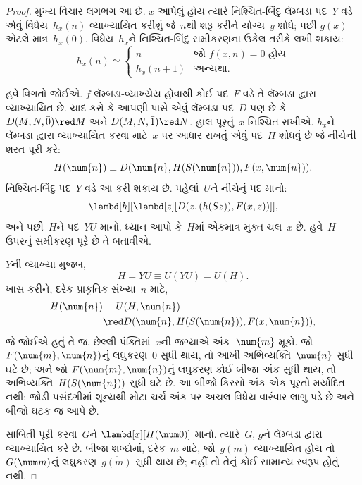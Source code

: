 \begin{proof}
મુખ્ય વિચાર લગભગ આ છે. $x$ આપેલું હોય ત્યારે નિશ્ચિત-બિંદુ
લૅમ્બડા પદ~$Y$ વડે એવું વિધેય~$h_x(n)$ વ્યાખ્યાયિત કરીશું જે~$n$થી
શરૂ કરીને યોગ્ય~$y$ શોધે; પછી $g(x)$ એટલે માત્ર~$h_x(0)$.
વિધેય~$h_x$ને નિશ્ચિત-બિંદુ સમીકરણના ઉકેલ તરીકે લખી શકાય:
\[
h_x(n) \simeq
\begin{cases}
n & \text{જો $f(x,n) = 0$ હોય} \\
h_x(n+1) & \text{અન્યથા.}
\end{cases}
\]

હવે વિગતો જોઈએ. $f$ લૅમ્બડા-વ્યાખ્યેય હોવાથી કોઈ પદ~$F$
વડે તે લૅમ્બડા દ્વારા વ્યાખ્યાયિત છે. યાદ કરો કે આપણી પાસે એવું લૅમ્બડા
પદ~$D$ પણ છે કે $D(M, N, \bar{0}) \red M$ અને $D(M, N, \bar{1})
\red N$. હાલ પૂરતું~$x$ નિશ્ચિત રાખીએ. $h_x$ને
લૅમ્બડા દ્વારા વ્યાખ્યાયિત કરવા માટે~$x$ પર આધાર રાખતું એવું પદ~$H$
શોધવું છે જે નીચેની શરત પૂરી કરે:
\[
H(\num{n}) \equiv D(\num{n}, H(S(\num{n})), F(x, \num{n})).
\]
નિશ્ચિત-બિંદુ પદ~$Y$ વડે આ કરી શકાય છે. પહેલાં~$U$ને નીચેનું
પદ માનો:
\[
\lambd[h][\lambd[z][D(z,(h(Sz)),F(x,z))]],
\]
અને પછી~$H$ને પદ~$YU$ માનો. ધ્યાન આપો કે~$H$માં એકમાત્ર મુક્ત
ચલ~$x$ છે. હવે~$H$ ઉપરનું સમીકરણ પૂરે છે તે બતાવીએ.

$Y$ની વ્યાખ્યા મુજબ,
\[
H = YU \equiv U(YU) = U(H).
\]
ખાસ કરીને, દરેક પ્રાકૃતિક સંખ્યા~$n$ માટે,
\begin{align*}
H(\num{n}) & \equiv U(H, \num{n}) \\
& \red D(\num{n}, H(S(\num{n})), F(x, \num{n})),
\end{align*}
જે જોઈએ હતું તે જ. છેલ્લી પંક્તિમાં~$x$ની જગ્યાએ અંક~$\num{m}$
મૂકો. જો $F(\num{m}, \num{n})$નું લઘુકરણ~$\num{0}$ સુધી થાય,
તો આખી અભિવ્યક્તિ~$\num{n}$ સુધી ઘટે છે; અને જો
$F(\num{m}, \num{n})$નું લઘુકરણ કોઈ બીજા અંક સુધી થાય,
તો અભિવ્યક્તિ~$H(S(\num{n}))$ સુધી ઘટે છે.
આ બીજો કિસ્સો અંક એક પૂરતો મર્યાદિત નથી: જોડી-પસંદગીમાં શૂન્યથી
મોટા ચર્ચ અંક પર અચલ વિધેય વારંવાર લાગુ પડે છે અને બીજો ઘટક જ આપે છે.

સાબિતી પૂરી કરવા~$G$ને $\lambd[x][H(\num 0)]$ માનો.
ત્યારે~$G$, $g$ને લૅમ્બડા દ્વારા વ્યાખ્યાયિત કરે છે. બીજા શબ્દોમાં,
દરેક~$m$ માટે, જો~$g(m)$ વ્યાખ્યાયિત હોય તો
$G(\num m)$નું લઘુકરણ~$\overline {g(m)}$ સુધી થાય છે;
નહીં તો તેનું કોઈ સામાન્ય સ્વરૂપ હોતું નથી.
\end{proof}
\endgroup


